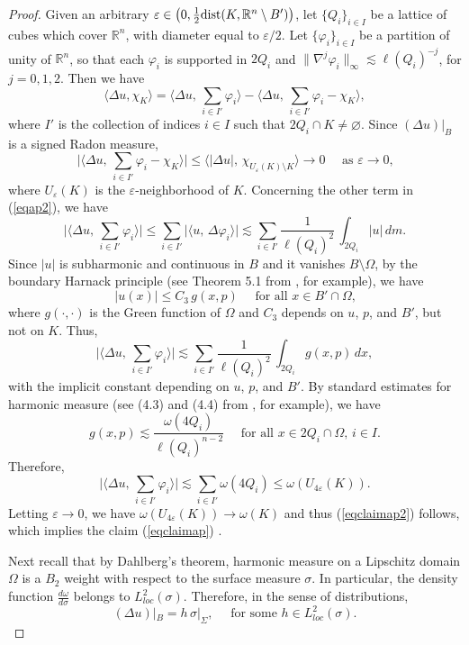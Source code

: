 \documentclass[11pt]{amsart}
\newcommand{\R}{{\mathbb R}}       %
\newcommand{\dist}{{\rm dist}}
\newcommand{\rf}[1]{{(\ref{#1})}}
\newcommand{\vphi}{{\varphi}}
\newcommand{\ve}{{\varepsilon}}
\theoremstyle{definition}
\theoremstyle{remark}
\numberwithin{equation}{section}
\begin{document}
\begin{proof}
 Given an arbitrary $\ve\in \big(0,\frac12\dist(K,\R^n\setminus B')\big)$,
let $\{Q_i\}_{i\in I}$ be a lattice of cubes which cover $\R^n$, with diameter equal to $\ve/2$. Let 
$\{\vphi_i\}_{i\in I}$ be a partition of unity of $\R^n$, so that each $\vphi_i$ is supported
in $2Q_i$ and $\|\nabla^j\vphi_i\|_\infty\lesssim \ell(Q_i)^{-j}$, for $j=0,1,2$.
Then we have
\begin{equation}\label{eqap2}
\langle \Delta u,\chi_K\rangle = \Big\langle \Delta u,\,\sum_{i\in I'} \vphi_i\Big\rangle - 
\Big\langle \Delta u,\,\sum_{i\in I'} \vphi_i -\chi_K\Big\rangle,
\end{equation}
where $I'$ is the collection of indices $i\in I$ such that $2Q_i\cap K\neq\varnothing$.
Since $(\Delta u)|_B$ is a signed Radon measure,
$$\Big|\Big\langle \Delta u,\,\sum_{i\in I'} \vphi_i -\chi_K\Big\rangle\Big|
\leq \big\langle |\Delta u|,\, \chi_{U_\ve(K)\setminus K}\big\rangle\to 0\quad
\mbox{ as $\ve\to0$,}$$
where $U_\ve(K)$ is the $\ve$-neighborhood of $K$.
Concerning the other term in \rf{eqap2}, we have
$$\Big|\Big\langle \Delta u,\,\sum_{i\in I'} \vphi_i\Big\rangle\Big| \leq \sum_{i\in I'}
\Big|\Big\langle  u,\, \Delta\vphi_i\Big\rangle\Big| \lesssim \sum_{i\in I'}\frac1{\ell(Q_i)^2}\,\int_{2Q_i}
|u|\,dm.$$
Since $|u|$ is subharmonic and continuous in $B$ and it vanishes $B\setminus\Omega$, by the
boundary Harnack principle (see Theorem 5.1 from \cite{JK}, for example), we have
$$|u(x)| \leq C_3\,g(x,p)\quad \mbox{ for all $x\in B'\cap\Omega$,}$$
where $g(\cdot,\cdot)$ is the Green function of $\Omega$ and $C_3$ depends on $u$, $p$, and $B'$, but not on $K$.
Thus, 
$$\Big|\Big\langle \Delta u,\,\sum_{i\in I'} \vphi_i\Big\rangle\Big| \lesssim \sum_{i\in I'}
\frac1{\ell(Q_i)^2}\,\int_{2Q_i} g(x,p)\,dx,$$
with the implicit constant depending on $u$, $p$, and $B'$. By standard estimates for
harmonic measure (see (4.3) and (4.4) from \cite{JK}, for example), we have
$$g(x,p)\lesssim \frac{\omega(4Q_i)}{\ell(Q_i)^{n-2}} \quad \mbox{ for all $x\in 2Q_i\cap \Omega$, $i\in I$.}$$
Therefore,
$$\Big|\Big\langle \Delta u,\,\sum_{i\in I'} \vphi_i\Big\rangle\Big| \lesssim 
\sum_{i\in I'}\omega(4Q_i) \leq \omega(U_{4\ve}(K)).
$$
Letting $\ve\to 0$, we have $\omega(U_{4\ve}(K))\to\omega(K)$ and thus \rf{eqclaimap2} follows, 
which implies the claim \rf{eqclaimap} .

Next recall that by Dahlberg's theorem, harmonic measure on a Lipschitz domain $\Omega$ is a $B_2$ weight with respect to the surface measure $\sigma$. In particular, 
the density function $\frac{d\omega}{d\sigma}$ belongs to $L^2_{loc}(\sigma)$. Therefore,
in the sense of distributions,
$$(\Delta u)|_B = h\,\sigma|_\Sigma,\quad \mbox{ for some $h\in L^2_{loc}(\sigma)$.}$$


\end{proof}
\end{document}
